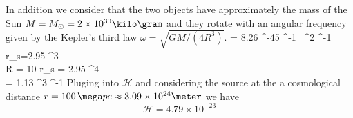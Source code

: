 In addition we consider that the two objects have approximately the mass of the Sun $M=M_{\odot}=2\times 10^{30} \kilo \gram $ and they rotate with an angular frequency given by the Kepler's third law $\omega = \sqrt{GM/(4R^{3})}$.
\bea
{} = 8.26 ^{-45} \kilo \gram^{-1} \, \second ^{2} \meter ^{-1} 
\\
r_s=2.95 ^{3} \, \meter
\\
R  = 10 r_s = 2.95  ^{4} \, \meter
\\
\omega = 1.13  ^{3} \second ^{-1}
\eea
Pluging into $\mathcal{H}$ and considering the source at the a cosmological distance $r= 100 \, \mega pc \approx 3.09 \times 10^{24} \meter$ we have
\[
\mathcal{H} = 4.79 \times 10^{-23}
\]


